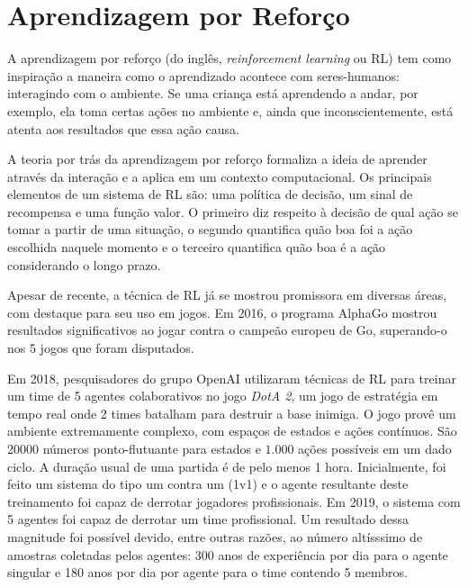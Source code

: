 \section{Aprendizagem por Reforço}
\par A aprendizagem por reforço (do inglês, \textit{reinforcement learning} ou RL) tem como inspiração a maneira como o aprendizado acontece com seres-humanos: interagindo com o ambiente. \cite{sutton2018reinforcement} Se uma criança está aprendendo a andar, por exemplo, ela toma certas ações no ambiente e, ainda que inconscientemente, está atenta aos resultados que essa ação causa. 
\par A teoria por trás da aprendizagem por reforço formaliza a ideia de aprender através da interação e a aplica em um contexto computacional. Os principais elementos de um sistema de RL são: uma política de decisão, um sinal de recompensa e uma função valor.  O primeiro diz respeito à decisão de qual ação se tomar a partir de uma situação, o segundo quantifica quão boa foi a ação escolhida naquele momento e o terceiro quantifica quão boa é a ação considerando o longo prazo.\cite{sutton2018reinforcement}
\par Apesar de recente, a técnica de RL já se mostrou promissora em diversas áreas, com destaque para seu uso em jogos. Em 2016, o programa AlphaGo mostrou resultados significativos ao jogar contra o campeão europeu de Go, superando-o nos 5 jogos que foram disputados. \cite{SilverHuangEtAl16nature}

Em 2018, pesquisadores do grupo OpenAI utilizaram técnicas de RL para treinar um time de 5 agentes colaborativos no jogo \textit{DotA 2}, um jogo de estratégia em tempo real onde 2 times batalham para destruir a base inimiga. O jogo provê um ambiente extremamente complexo, com espaços de estados e ações contínuos. São 20000 números ponto-flutuante para estados e $1.000$ ações possíveis em um dado ciclo.
A duração usual de uma partida é de pelo menos 1 hora. Inicialmente, foi feito um sistema do tipo um contra um (1v1) e o agente resultante deste treinamento foi capaz de derrotar jogadores profissionais. Em 2019, o sistema com 5 agentes foi capaz de derrotar um time profissional. \cite{OpenAI_dota} Um resultado dessa magnitude foi possível devido, entre outras razões, ao número altísssimo de amostras coletadas pelos agentes: 300 anos de experiência por dia para o agente singular e 180 anos por dia por agente para o time contendo 5 membros.

